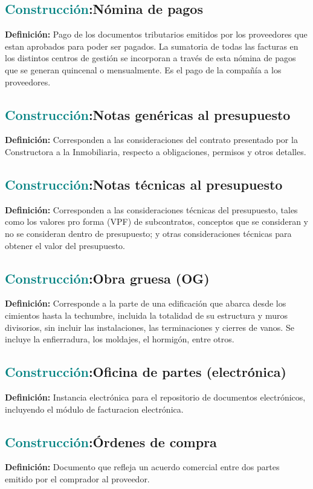\documentclass[12pt]{article}
\begin{document}
\subsection{\textcolor{teal}{Construcción}:{Nómina de pagos}}
\textbf{Definición:} Pago de los documentos tributarios emitidos por los proveedores que estan aprobados para poder ser pagados. La sumatoria de todas las facturas en los distintos centros de gestión se incorporan a través de esta nómina de pagos que se generan quincenal o mensualmente. Es el pago de la compañía a los proveedores.
\subsection{\textcolor{teal}{Construcción}:{Notas genéricas al presupuesto}}
\textbf{Definición:} Corresponden a las consideraciones del contrato presentado por la Constructora a la Inmobiliaria, respecto a obligaciones, permisos y otros detalles.
\subsection{\textcolor{teal}{Construcción}:{Notas técnicas al presupuesto}}
\textbf{Definición:} Corresponden a las consideraciones técnicas del presupuesto, tales como los valores pro forma (VPF) de subcontratos, conceptos que se consideran y no se consideran dentro de presupuesto; y otras consideraciones técnicas para obtener el valor del presupuesto.
\subsection{\textcolor{teal}{Construcción}:{Obra gruesa (OG)}}
\textbf{Definición:} Corresponde a la parte de una edificación que abarca desde los cimientos hasta la techumbre, incluida la totalidad de su estructura y muros divisorios, sin incluir las instalaciones, las terminaciones y cierres de vanos. Se incluye la enfierradura, los moldajes, el hormigón, entre otros.
\subsection{\textcolor{teal}{Construcción}:{Oficina de partes (electrónica)}}
\textbf{Definición:} Instancia electrónica para el repositorio de documentos electrónicos, incluyendo el módulo de facturacion electrónica.
\subsection{\textcolor{teal}{Construcción}:{Órdenes de compra}}
\textbf{Definición:} Documento que refleja un acuerdo comercial entre dos partes emitido por el comprador al proveedor.
\end{document}

